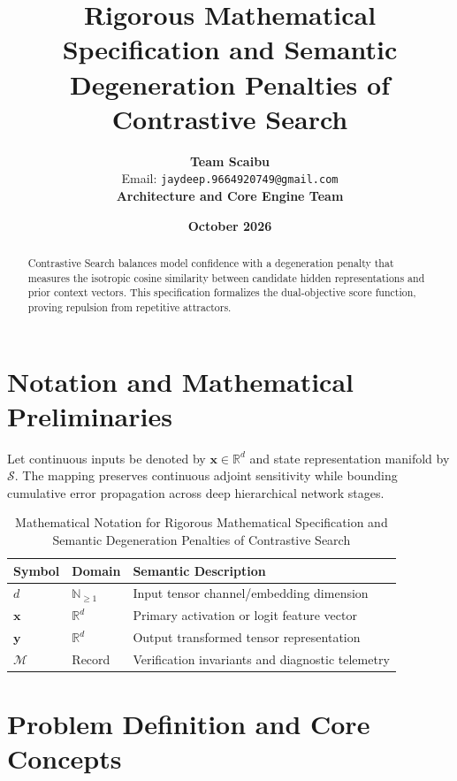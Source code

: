 \documentclass[11pt,a4paper]{article}
\title{\textbf{Rigorous Mathematical Specification and Semantic Degeneration Penalties of Contrastive Search}}
\author{\textbf{Team Scaibu} \\ \small Email: \texttt{jaydeep.9664920749@gmail.com} \\ \small \textbf{Architecture and Core Engine Team}}
\date{\textbf{October 2026}}
\theoremstyle{definition}
\begin{document}
\maketitle

\begin{abstract}
Contrastive Search balances model confidence with a degeneration penalty that measures the isotropic cosine similarity between candidate hidden representations and prior context vectors. This specification formalizes the dual-objective score function, proving repulsion from repetitive attractors.
\end{abstract}

\section{Notation and Mathematical Preliminaries}

Let continuous inputs be denoted by $\mathbf{x} \in \mathbb{R}^d$ and state representation manifold by $\mathcal{S}$. The mapping preserves continuous adjoint sensitivity while bounding cumulative error propagation across deep hierarchical network stages.

\begin{table}[h]
\centering
\caption{Mathematical Notation for Rigorous Mathematical Specification and Semantic Degeneration Penalties of Contrastive Search}
\begin{tabular}{lll}
\toprule
\textbf{Symbol} & \textbf{Domain} & \textbf{Semantic Description} \\
\midrule
$d$ & $\mathbb{N}_{\ge 1}$ & Input tensor channel/embedding dimension \\
$\mathbf{x}$ & $\mathbb{R}^d$ & Primary activation or logit feature vector \\
$\mathbf{y}$ & $\mathbb{R}^d$ & Output transformed tensor representation \\
$\mathcal{M}$ & Record & Verification invariants and diagnostic telemetry \\
\bottomrule
\end{tabular}
\end{table}

\section{Problem Definition and Core Concepts}
\end{document}
